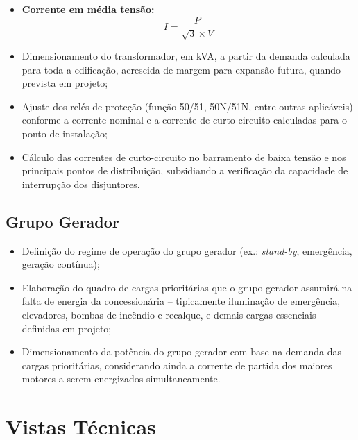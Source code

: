 \documentclass[12pt,openright,oneside,a4paper,brazil]{abntex2}
\begin{document}
\hspace{1.27cm} \begin{itemize}[leftmargin=1.2cm]
    \item \textbf{Corrente em média tensão:}
    \begin{equation}
        I = \dfrac{P}{\sqrt{3} \times V}
        \label{eq:corrente_mt}
    \end{equation}
    \item Dimensionamento do transformador, em \si{kVA}, a partir da
    demanda calculada para toda a edificação, acrescida de margem para
    expansão futura, quando prevista em projeto;
    \item Ajuste dos relés de proteção (função 50/51, 50N/51N, entre
    outras aplicáveis) conforme a corrente nominal e a corrente de
    curto-circuito calculadas para o ponto de instalação;
    \item Cálculo das correntes de curto-circuito no barramento de baixa
    tensão e nos principais pontos de distribuição, subsidiando a
    verificação da capacidade de interrupção dos disjuntores.
\end{itemize}

\subsection{Grupo Gerador}

\hspace{1.27cm} \begin{itemize}[leftmargin=1.2cm]
    \item Definição do regime de operação do grupo gerador (ex.:
    \emph{stand-by}, emergência, geração contínua);
    \item Elaboração do quadro de cargas prioritárias que o grupo gerador
    assumirá na falta de energia da concessionária -- tipicamente
    iluminação de emergência, elevadores, bombas de incêndio e recalque,
    e demais cargas essenciais definidas em projeto;
    \item Dimensionamento da potência do grupo gerador com base na demanda
    das cargas prioritárias, considerando ainda a corrente de partida dos
    maiores motores a serem energizados simultaneamente.
\end{itemize}

\section{Vistas Técnicas}
\end{document}
